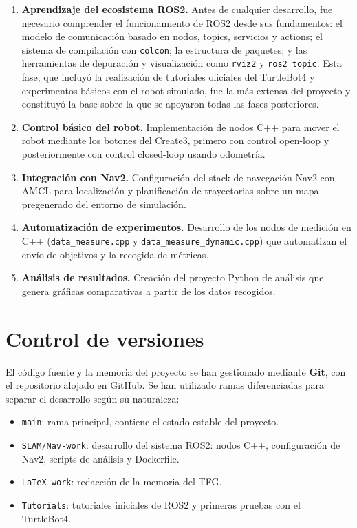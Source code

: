 \begin{enumerate}
    \item \textbf{Aprendizaje del ecosistema ROS2.} Antes de cualquier desarrollo, fue necesario comprender el funcionamiento de ROS2 desde sus fundamentos: el modelo de comunicación basado en nodos, topics, servicios y actions; el sistema de compilación con \texttt{colcon}; la estructura de paquetes; y las herramientas de depuración y visualización como \texttt{rviz2} y \texttt{ros2 topic}. Esta fase, que incluyó la realización de tutoriales oficiales del TurtleBot4 y experimentos básicos con el robot simulado, fue la más extensa del proyecto y constituyó la base sobre la que se apoyaron todas las fases posteriores.
    \item \textbf{Control básico del robot.} Implementación de nodos C++ para mover el robot mediante los botones del Create3, primero con control open-loop y posteriormente con control closed-loop usando odometría.
    \item \textbf{Integración con Nav2.} Configuración del stack de navegación Nav2 con AMCL para localización y planificación de trayectorias sobre un mapa pregenerado del entorno de simulación.
    \item \textbf{Automatización de experimentos.} Desarrollo de los nodos de medición en C++ (\texttt{data\_measure.cpp} y \texttt{data\_measure\_dynamic.cpp}) que automatizan el envío de objetivos y la recogida de métricas.
    \item \textbf{Análisis de resultados.} Creación del proyecto Python de análisis que genera gráficas comparativas a partir de los datos recogidos.
\end{enumerate}

\section{Control de versiones}

El código fuente y la memoria del proyecto se han gestionado mediante \textbf{Git}, con el repositorio alojado en GitHub. Se han utilizado ramas diferenciadas para separar el desarrollo según su naturaleza:

\begin{itemize}
    \item \texttt{main}: rama principal, contiene el estado estable del proyecto.
    \item \texttt{SLAM/Nav-work}: desarrollo del sistema ROS2: nodos C++, configuración de Nav2, scripts de análisis y Dockerfile.
    \item \texttt{LaTeX-work}: redacción de la memoria del TFG.
    \item \texttt{Tutorials}: tutoriales iniciales de ROS2 y primeras pruebas con el TurtleBot4.
\end{itemize}

